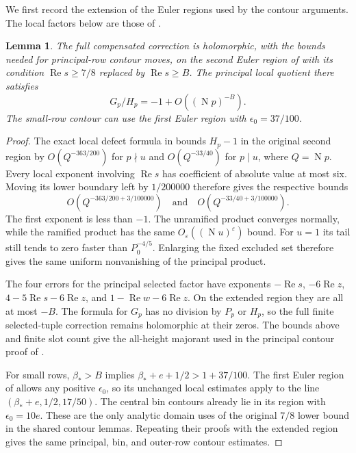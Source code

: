 \documentclass[11pt]{article}
\newtheorem{lemma}[theorem]{Lemma}
\newcommand{\Ree}{\operatorname{Re}}
\newcommand{\NF}{\operatorname{N}}
\begin{document}
We first record the extension of the Euler regions used by the contour
arguments. The local factors below are those of
\cite[Equations (5.13a)--(5.13c)]{OAI}.

\begin{lemma}\label{lem:analytic}
The full compensated correction is holomorphic, with the bounds needed
for principal-row contour moves, on the second Euler region of \cite{OAI}
with its condition $\Ree s\ge7/8$ replaced by $\Ree s\ge B$. The
principal local quotient there satisfies
\[
       G_p/H_p=-1+O((\NF p)^{-B}).
\]
The small-row contour can use the first Euler region with
$\epsilon_0=37/100$.
\end{lemma}

\begin{proof}
The exact local defect formula in \cite[local Euler lemma]{OAI} bounds
$H_p-1$ in the original second
region by $O(Q^{-363/200})$ for $p\nmid u$ and $O(Q^{-33/40})$
for $p\mid u$, where $Q=\NF p$. Every local exponent involving
$\Ree s$ has coefficient of absolute value at most six. Moving its
lower boundary left by $1/200000$ therefore gives the respective bounds
\[
 O(Q^{-363/200+3/100000})\quad\text{and}\quad
 O(Q^{-33/40+3/100000}).
\]
The first exponent is less than $-1$. The unramified product converges
normally, while the ramified product has the same $O_\varepsilon((\NF
u)^\varepsilon)$ bound. For $u=1$ its tail still tends to zero faster
than $P_0^{-4/5}$. Enlarging the fixed excluded set therefore gives the
same uniform nonvanishing of the principal product.

The four errors for the principal selected factor have exponents
$-\Ree s$, $-6\Ree z$, $4-5\Ree s-6\Ree z$, and
$1-\Ree w-6\Ree z$. On the extended region they are all at most
$-B$. The formula for $G_p$ has no division by $P_p$ or $H_p$, so the
full finite selected-tuple correction remains holomorphic at their zeros.
The bounds above and finite slot count give the all-height majorant used
in the principal contour proof of \cite{OAI}.

For small rows, $\beta_*>B$ implies
$\beta_*+e+1/2>1+37/100$. The first Euler region of \cite{OAI}
allows any positive $\epsilon_0$, so its unchanged local estimates apply
to the line $(\beta_*+e,1/2,17/50)$. The central bin contours already
lie in its region with $\epsilon_0=10e$. These are the only analytic
domain uses of the original $7/8$ lower bound in the shared contour
lemmas. Repeating their proofs with the extended region gives the same
principal, bin, and outer-row contour estimates.
\end{proof}
\end{document}
